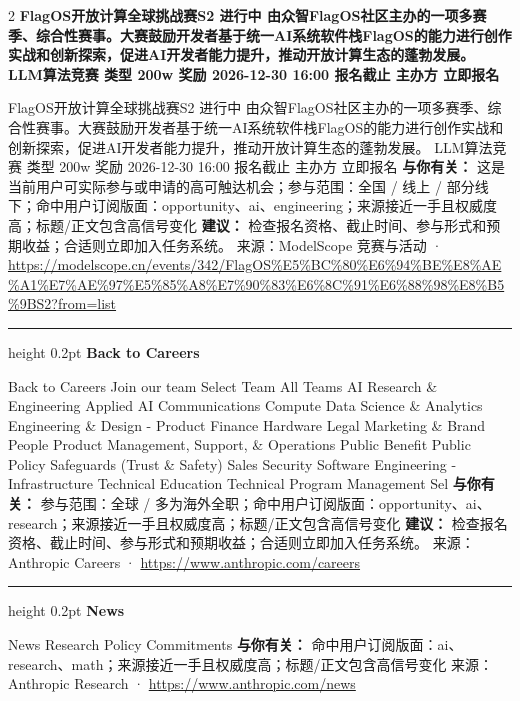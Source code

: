 \documentclass[10.5pt]{ctexart}
\begin{document}
\begin{multicols}{2}
{\large\bfseries FlagOS开放计算全球挑战赛S2 进行中 由众智FlagOS社区主办的一项多赛季、综合性赛事。大赛鼓励开发者基于统一AI系统软件栈FlagOS的能力进行创作实战和创新探索，促进AI开发者能力提升，推动开放计算生态的蓬勃发展。 LLM算法竞赛 类型 200w 奖励 2026-12-30 16:00 报名截止 主办方 立即报名}\par
FlagOS开放计算全球挑战赛S2 进行中 由众智FlagOS社区主办的一项多赛季、综合性赛事。大赛鼓励开发者基于统一AI系统软件栈FlagOS的能力进行创作实战和创新探索，促进AI开发者能力提升，推动开放计算生态的蓬勃发展。 LLM算法竞赛 类型 200w 奖励 2026-12-30 16:00 报名截止 主办方 立即报名
\textbf{与你有关：} 这是当前用户可实际参与或申请的高可触达机会；参与范围：全国 / 线上 / 部分线下；命中用户订阅版面：opportunity、ai、engineering；来源接近一手且权威度高；标题/正文包含高信号变化
\textbf{建议：} 检查报名资格、截止时间、参与形式和预期收益；合适则立即加入任务系统。
{\footnotesize\color{ormuted} 来源：ModelScope 竞赛与活动 · \url{https://modelscope.cn/events/342/FlagOS%E5%BC%80%E6%94%BE%E8%AE%A1%E7%AE%97%E5%85%A8%E7%90%83%E6%8C%91%E6%88%98%E8%B5%9BS2?from=list}}
\vspace{2mm}
\hrule height 0.2pt
\vspace{2mm}
{\large\bfseries Back to Careers}\par
Back to Careers Join our team Select Team All Teams AI Research \& Engineering Applied AI Communications Compute Data Science \& Analytics Engineering \& Design - Product Finance Hardware Legal Marketing \& Brand People Product Management, Support, \& Operations Public Benefit Public Policy Safeguards (Trust \& Safety) Sales Security Software Engineering - Infrastructure Technical Education Technical Program Management Sel
\textbf{与你有关：} 参与范围：全球 / 多为海外全职；命中用户订阅版面：opportunity、ai、research；来源接近一手且权威度高；标题/正文包含高信号变化
\textbf{建议：} 检查报名资格、截止时间、参与形式和预期收益；合适则立即加入任务系统。
{\footnotesize\color{ormuted} 来源：Anthropic Careers · \url{https://www.anthropic.com/careers}}
\vspace{2mm}
\hrule height 0.2pt
\vspace{2mm}
{\large\bfseries News}\par
News Research Policy Commitments
\textbf{与你有关：} 命中用户订阅版面：ai、research、math；来源接近一手且权威度高；标题/正文包含高信号变化
{\footnotesize\color{ormuted} 来源：Anthropic Research · \url{https://www.anthropic.com/news}}
\end{multicols}
\end{document}
